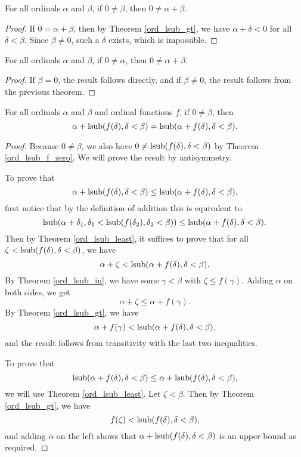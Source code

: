 \documentclass[../../math.tex]{subfiles}
\begin{document}
\begin{theorem} \label{ord_nz_rplus}
    For all ordinals $\alpha$ and $\beta$, if $0 \neq \beta$, then $0 \neq
    \alpha + \beta$.
\end{theorem}
\begin{proof}
    If $0 = \alpha + \beta$, then by Theorem \ref{ord_lsub_gt}, we have $\alpha
    + \delta < 0$ for all $\delta < \beta$.  Since $\beta \neq 0$, such a
    $\delta$ exists, which is impossible.
\end{proof}

\begin{theorem} \label{ord_nz_lplus}
    For all ordinals $\alpha$ and $\beta$, if $0 \neq \alpha$, then $0 \neq
    \alpha + \beta$.
\end{theorem}
\begin{proof}
    If $\beta = 0$, the result follows directly, and if $\beta \neq 0$, the
    result follows from the previous theorem.
\end{proof}

\begin{theorem} \label{ord_lsub_plus}
    For all ordinals $\alpha$ and $\beta$ and ordinal functions $f$, if $0 \neq
    \beta$, then
    \[
        \alpha + \operatorname{lsub}(f(\delta), \delta < \beta)
        = \operatorname{lsub}(\alpha + f(\delta), \delta < \beta).
    \]
\end{theorem}
\begin{proof}
    Because $0 \neq \beta$, we also have $0 \neq \operatorname{lsub}(f(\delta), \delta <
    \beta)$ by Theorem \ref{ord_lsub_f_zero}.  We will prove the result by
    antisymmetry.

    To prove that
    \[
        \alpha + \operatorname{lsub}(f(\delta), \delta < \beta)
        \leq \operatorname{lsub}(\alpha + f(\delta), \delta < \beta),
    \]
    first notice that by the definition of addition this is equivalent to
    \[
        \operatorname{lsub}(\alpha + \delta_1, \delta_1 < \operatorname{lsub}(f(\delta_2), \delta_2 <
        \beta)) \leq \operatorname{lsub}(\alpha + f(\delta), \delta < \beta).
    \]
    Then by Theorem \ref{ord_lsub_least}, it suffices to prove that for all
    $\zeta < \operatorname{lsub}(f(\delta), \delta < \beta)$, we have
    \[
        \alpha + \zeta < \operatorname{lsub}(\alpha + f(\delta), \delta < \beta).
    \]
    By Theorem \ref{ord_lsub_in}, we have some $\gamma < \beta$ with $\zeta
    \leq f(\gamma)$.  Adding $\alpha$ on both sides, we get
    \[
        \alpha + \zeta \leq \alpha + f(\gamma).
    \]
    By Theorem \ref{ord_lsub_gt}, we have
    \[
        \alpha + f(\gamma) < \operatorname{lsub}(\alpha + f(\delta), \delta < \beta),
    \]
    and the result follows from transitivity with the last two inequalities.

    To prove that
    \[
        \operatorname{lsub}(\alpha + f(\delta), \delta < \beta)
        \leq \alpha + \operatorname{lsub}(f(\delta), \delta < \beta),
    \]
    we will use Theorem \ref{ord_lsub_least}.  Let $\zeta < \beta$.  Then by
    Theorem \ref{ord_lsub_gt}, we have
    \[
        f(\zeta) < \operatorname{lsub}(f(\delta), \delta < \beta),
    \]
    and adding $\alpha$ on the left shows that $\alpha + \operatorname{lsub}(f(\delta), \delta
    < \beta)$ is an upper bound as required.
\end{proof}
\end{document}
